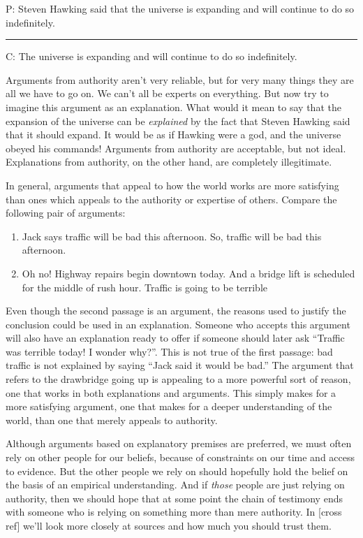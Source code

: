  \begin{earg}
\item[P:] Steven Hawking said that the universe is expanding and will continue to do so indefinitely.
\vspace{-.5em}
\item [] \rule{\linewidth}{.5pt} 
\item[C:] The universe is expanding and will continue to do so indefinitely.
\end{earg} 

Arguments from authority aren't very reliable, but for very many things they are all we have to go on. We can't all be experts on everything. But now try to imagine this argument as an explanation. What would it mean to say that the expansion of the universe can be \textit{explained} by the fact that Steven Hawking said that it should expand. It would be as if Hawking were a god, and the universe obeyed his commands! Arguments from authority are acceptable, but not ideal. Explanations from authority, on the other hand, are completely illegitimate. \label{no_exp_from_authority}

In general, arguments that appeal to how the world works are more satisfying than ones which appeals to the authority or expertise of others. Compare the following pair of arguments:

\begin{enumerate}[label=(\alph*)]
\item Jack says traffic will be bad this afternoon. So, traffic will be bad this afternoon. 
\item Oh no! Highway repairs begin downtown today. And a bridge lift is scheduled for the middle of rush hour. Traffic is going to be terrible \end{enumerate}

Even though the second passage is an argument, the reasons used to justify the conclusion could be used in an explanation. Someone who accepts this argument will also have an explanation ready to offer if someone should later ask ``Traffic was terrible today! I wonder why?''. This is not true of the first passage: bad traffic is not explained by saying ``Jack said it would be bad.'' The argument that refers to the drawbridge going up is appealing to a more powerful sort of reason, one that works in both explanations and arguments. This simply makes for a more satisfying argument, one that makes for a deeper understanding of the world, than one that merely appeals to authority. 

Although arguments based on explanatory premises are preferred, we must often rely on other people for our beliefs, because of constraints on our time and access to evidence. But the other people we rely on should hopefully hold the belief on the basis of an empirical understanding. And if \textit{those} people are just relying on authority, then we should hope that at some point the chain of testimony ends with someone who is relying on something more than mere authority. In [cross ref] we'll look more closely at sources and how much you should trust them.

